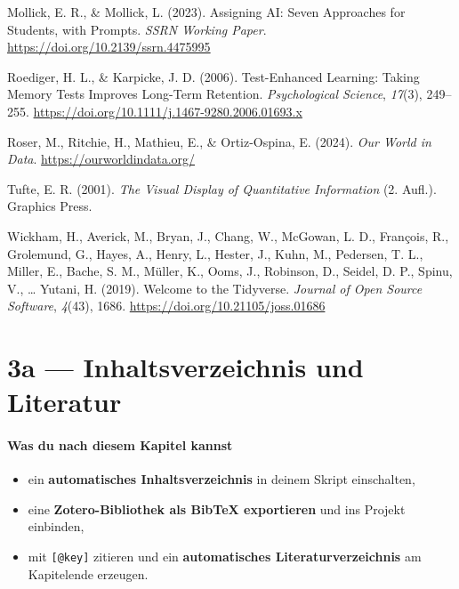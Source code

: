 \documentclass[
  ngerman,
  a4paper,
  DIV=11]{scrreprt}
\newlength{\cslhangindent}
\newenvironment{CSLReferences}[2] %
 {\begin{list}{}{%
  \setlength{\itemindent}{0pt}
  \setlength{\leftmargin}{0pt}
  \setlength{\parsep}{0pt}
  \ifodd #1
   \setlength{\leftmargin}{\cslhangindent}
   \setlength{\itemindent}{-1\cslhangindent}
  \fi
  \setlength{\itemsep}{#2\baselineskip}}}
 {\end{list}}
\providecommand{\tightlist}{%
  \setlength{\itemsep}{0pt}\setlength{\parskip}{0pt}}
\begin{document}
\begin{CSLReferences}{1}{0}
Mollick, E. R., \& Mollick, L. (2023). Assigning {AI}: Seven Approaches
for Students, with Prompts. \emph{SSRN Working Paper}.
\url{https://doi.org/10.2139/ssrn.4475995}

Roediger, H. L., \& Karpicke, J. D. (2006). Test-Enhanced Learning:
Taking Memory Tests Improves Long-Term Retention. \emph{Psychological
Science}, \emph{17}(3), 249--255.
\url{https://doi.org/10.1111/j.1467-9280.2006.01693.x}

Roser, M., Ritchie, H., Mathieu, E., \& Ortiz-Ospina, E. (2024).
\emph{Our World in Data}. \url{https://ourworldindata.org/}

Tufte, E. R. (2001). \emph{The Visual Display of Quantitative
Information} (2. Aufl.). Graphics Press.

Wickham, H., Averick, M., Bryan, J., Chang, W., McGowan, L. D.,
François, R., Grolemund, G., Hayes, A., Henry, L., Hester, J., Kuhn, M.,
Pedersen, T. L., Miller, E., Bache, S. M., Müller, K., Ooms, J.,
Robinson, D., Seidel, D. P., Spinu, V., \ldots{} Yutani, H. (2019).
Welcome to the Tidyverse. \emph{Journal of Open Source Software},
\emph{4}(43), 1686. \url{https://doi.org/10.21105/joss.01686}

\end{CSLReferences}

\chapter{3a --- Inhaltsverzeichnis und
Literatur}\label{a-inhaltsverzeichnis-und-literatur}

\subsubsection{Was du nach diesem Kapitel
kannst}\label{was-du-nach-diesem-kapitel-kannst-2}

\begin{itemize}
\tightlist
\item
  ein \textbf{automatisches Inhaltsverzeichnis} in deinem Skript
  einschalten,
\item
  eine \textbf{Zotero-Bibliothek als BibTeX exportieren} und ins Projekt
  einbinden,
\item
  mit \texttt{{[}@key{]}} zitieren und ein \textbf{automatisches
  Literaturverzeichnis} am Kapitelende erzeugen.
\end{itemize}
\end{document}
